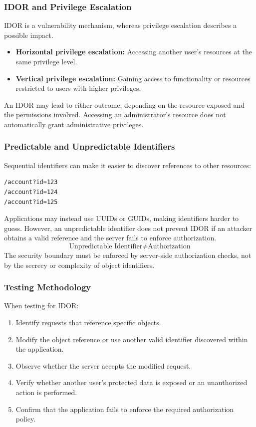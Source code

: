 \documentclass[11pt,a4paper]{article}
\begin{document}
\subsubsection{IDOR and Privilege Escalation}

IDOR is a vulnerability mechanism, whereas privilege escalation describes a possible impact.

\begin{itemize}
    \item \textbf{Horizontal privilege escalation:} Accessing another user's resources at the same privilege level.
    \item \textbf{Vertical privilege escalation:} Gaining access to functionality or resources restricted to users with higher privileges.
\end{itemize}

An IDOR may lead to either outcome, depending on the resource exposed and the permissions involved. Accessing an administrator's resource does not automatically grant administrative privileges.

\subsubsection{Predictable and Unpredictable Identifiers}

Sequential identifiers can make it easier to discover references to other resources:
\begin{lstlisting}
/account?id=123
/account?id=124
/account?id=125
\end{lstlisting}

Applications may instead use UUIDs or GUIDs, making identifiers harder to guess. However, an unpredictable identifier does not prevent IDOR if an attacker obtains a valid reference and the server fails to enforce authorization.
\[
    \text{Unpredictable Identifier}
    \neq
    \text{Authorization}
\]
The security boundary must be enforced by server-side authorization checks, not by the secrecy or complexity of object identifiers.

\subsubsection{Testing Methodology}

When testing for IDOR:
\begin{enumerate}
    \item Identify requests that reference specific objects.
    \item Modify the object reference or use another valid identifier discovered within the application.
    \item Observe whether the server accepts the modified request.
    \item Verify whether another user's protected data is exposed or an unauthorized action is performed.
    \item Confirm that the application fails to enforce the required authorization policy.
\end{enumerate}
\end{document}
